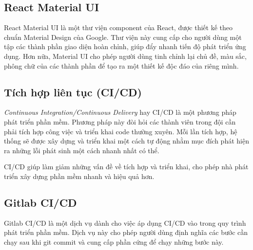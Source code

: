 \documentclass[./../main.tex]{subfiles}
\begin{document}
\hypertarget{react-material-ui}{%
\subsection{React Material UI}\label{react-material-ui}}

React Material UI là một thư viện component của React, được thiết kế
theo chuẩn Material Design của Google. Thư viện này cung cấp cho người
dùng một tập các thành phần giao diện hoàn chỉnh, giúp đẩy nhanh tiến độ
phát triển ứng dụng. Hơn nữa, Material UI cho phép người dùng tinh chỉnh
lại chủ đề, màu sắc, phông chữ của các thành phần để tạo ra một thiết kế
độc đáo của riêng mình.

\hypertarget{tuxedch-hux1ee3p-liuxean-tux1ee5c-cicd}{%
\subsection{Tích hợp liên tục
(CI/CD)}\label{tuxedch-hux1ee3p-liuxean-tux1ee5c-cicd}}

\emph{Continuous Integration/Continuous Delivery} hay CI/CD là một
phương pháp phát triển phần mềm. Phương pháp này đòi hỏi các thành viên
trong đội cần phải tích hợp công việc và triển khai code thường xuyên.
Mỗi lần tích hợp, hệ thống sẽ được xây dựng và triển khai một cách tự
động nhằm mục đích phát hiện ra những lỗi phát sinh một cách nhanh nhất
có thể.

CI/CD giúp làm giảm những vấn đề về tích hợp và triển khai, cho phép nhà
phát triển xây dựng phần mềm nhanh và hiệu quả hơn.

\hypertarget{gitlab-cicd}{%
\subsection{Gitlab CI/CD}\label{gitlab-cicd}}

Gitlab CI/CD \cite{Git22} là một dịch vụ dành cho việc áp dụng CI/CD vào trong quy
trình phát triển phần mềm. Dịch vụ này cho phép người dùng định nghĩa
các bước cần chạy sau khi git commit và cung cấp phần cứng để chạy những
bước này.
\end{document}
